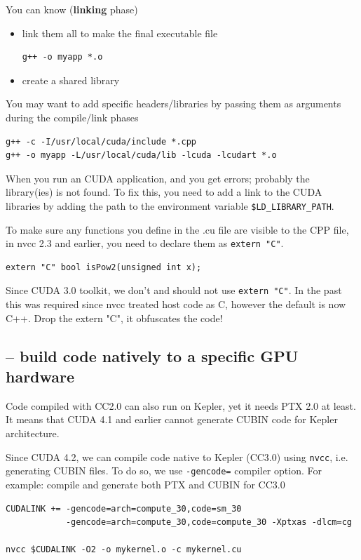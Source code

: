 You can know ({\bf linking} phase)
\begin{itemize}
\item link them all to make the final executable file
\begin{verbatim}
g++ -o myapp *.o
\end{verbatim}

\item create a shared library

\end{itemize}

\begin{framed}
  You may want to add specific headers/libraries by passing them as
  arguments during the compile/link phases
\begin{verbatim}
g++ -c -I/usr/local/cuda/include *.cpp
g++ -o myapp -L/usr/local/cuda/lib -lcuda -lcudart *.o
\end{verbatim}

When you run an CUDA application, and you get errors; probably the
library(ies) is not found. To fix this, you need to add a link to the
CUDA libraries by adding the path to the environment variable
\verb!$LD_LIBRARY_PATH!. 

To make sure any functions you define in the .cu file are visible to
the CPP file, in nvcc 2.3 and earlier, you need to declare them as
\verb!extern "C"!.
\begin{verbatim}
extern "C" bool isPow2(unsigned int x);
\end{verbatim}
Since CUDA 3.0 toolkit, we don't and should not use
\verb!extern "C"!. In the past this was required since nvcc treated
host code as C, however the default is now C++. Drop the extern "C",
it obfuscates the code!

\end{framed}

\subsection{-- build code natively to a specific GPU hardware}

Code compiled with CC2.0 can also run on Kepler, yet it needs PTX 2.0 at least.
It means that CUDA 4.1 and earlier cannot generate CUBIN code for Kepler
architecture.

Since CUDA 4.2, we can compile code native to Kepler (CC3.0) using \verb!nvcc!,
i.e. generating CUBIN files. To do so, we use \verb!-gencode=! compiler option.
For example: compile and generate both PTX and CUBIN for CC3.0
\begin{verbatim}
CUDALINK += -gencode=arch=compute_30,code=sm_30 
            -gencode=arch=compute_30,code=compute_30 -Xptxas -dlcm=cg

nvcc $CUDALINK -O2 -o mykernel.o -c mykernel.cu 
\end{verbatim}

